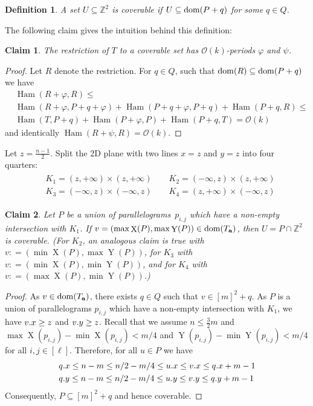 \documentclass[twoside,leqno]{article}
\newtheorem{definition}{Definition}[section]
\newtheorem{claim}{Claim}[section]
\newcommand{\Z}{\mathbb{Z}}
\renewcommand{\O}{\mathcal{O}}
\renewcommand{\phi}{\varphi}
\DeclareMathOperator*{\X}{X}
\DeclareMathOperator*{\Y}{Y}
\DeclareMathOperator*{\Ham}{Ham}
\begin{document}
\begin{definition}
A set $U \subseteq \Z^2$ is \emph{coverable} if $U \subseteq \operatorname*{dom}(P + q)$ for some $q \in Q$.
\end{definition}

The following claim gives the intuition behind this definition:

\begin{claim}\label{coverable is periodic}
	The restriction of $T$ to a coverable set has $\O(k)$-periods $\phi$ and $\psi$.
\end{claim}	
	\begin{proof}
		Let $R$ denote the restriction. For $q \in Q$, such that $\operatorname*{dom}(R) \subseteq \operatorname*{dom}(P + q)$ we have
\begin{align*}
&\Ham(R + \phi, R) \le \\
&\Ham(R + \phi, P + q + \phi) + \Ham(P + q + \phi, P + q) + \Ham(P + q, R) \le \\
&\Ham(T, P + q) + \Ham(P + \phi, P) + \Ham(P + q, T) = \O(k)
\end{align*}
and identically $\Ham(R + \psi, R) = \O(k)$.
\end{proof}

Let $z = \frac{n - 1}{2}$. Split the 2D plane with two lines $x = z$ and $y = z$ into four quarters:
\begin{align}
\label{eq:quarters}
\begin{split}
&K_1 = (z, +\infty) \times (z, +\infty) \quad\quad K_2 = (-\infty, z) \times (z, +\infty)\\
&K_3 = (-\infty, z) \times (-\infty, z) \quad\quad K_4 = (z, +\infty) \times (-\infty, z)
\end{split}
\end{align}


\newcommand{\I}{\mathcal{I}}
\newcommand{\G}{\mathcal{G}}
\newcommand{\C}{\mathcal{C}}

\begin{claim}\label{coverable}
Let $P$ be a union of parallelograms~$p_{i,j}$ which have a non-empty intersection with $K_1$. If $v = (\max \X(P), \max \Y(P)) \in \d{\Ta}$, then $U = P \cap \Z^2$ is coverable. (For $K_2$, an analogous claim is true with $v: = (\min \X(P), \max \Y(P))$, for $K_3$ with $v : = (\min \X(P), \min \Y(P))$, and for $K_4$ with $v : = (\max \X(P), \min \Y(P))$.)
\end{claim}
\begin{proof}
As $v \in \operatorname*{dom}(T_\mathbf{a})$, there exists $q \in Q$ such that $v \in [m]^2 + q$. As $P$ is a union of parallelograms $p_{i,j}$ which have a non-empty intersection with $K_1$, we have $v.x \ge z$ and $v.y \ge z$. Recall that we assume $n \le \frac{3}{2} m$ and $\max \X(p_{i, j}) - \min \X(p_{i, j}) < m / 4$ and $\Y(p_{i, j}) - \min \Y(p_{i, j}) < m / 4$ for all $i, j \in [\ell]$. Therefore, for all $u \in P$ we have
\begin{align*}
&q.x \le n-m \le n/2-m/4 \le u.x \le v.x \le q.x + m-1\\
&q.y \le n-m \le n/2-m/4 \le u.y \le v.y \le q.y + m-1 
\end{align*}
\noindent Consequently, $P \subseteq [m]^2+q$ and hence coverable.
\end{proof}
\end{document}
